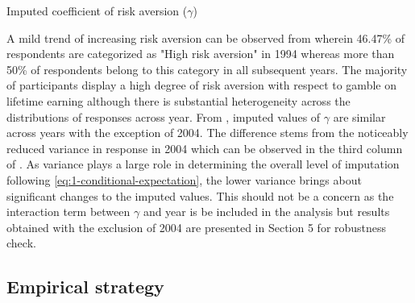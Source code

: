 \documentclass[]{article}
\begin{document}
\begin{table}[!b]
	\centering
	\setlength{\extrarowheight}{0.3em}
	\caption{Imputed coefficient of risk aversion ($\gamma$)}	
	
	\label{table:3-imputed-risk}
\end{table}

A mild trend of increasing risk aversion can be observed from  wherein 46.47\% of respondents are categorized as "High risk aversion" in 1994 whereas more than 50\% of respondents belong to this category in all subsequent years. The majority of participants display a high degree of risk aversion with respect to gamble on lifetime earning although there is substantial heterogeneity across the distributions of responses across year. From , imputed values of $\gamma$ are similar across years with the exception of 2004. The difference stems from the noticeably reduced variance in response in 2004 which can be observed in the third column of . As variance plays a large role in determining the overall level of imputation following \eqref{eq:1-conditional-expectation}, the lower variance brings about significant changes to the imputed values. This should not be a concern as the interaction term between $\gamma$ and year is be included in the analysis but results obtained with the exclusion of 2004 are presented in Section 5 for robustness check.

\subsection{Empirical strategy}



\end{document}
